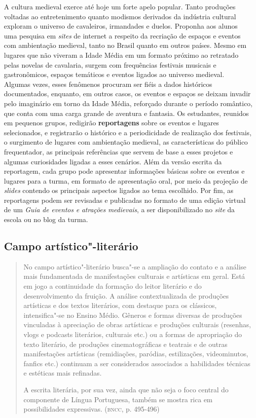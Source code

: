 \documentclass[11pt]{extarticle}
\begin{document}
  A cultura medieval exerce até hoje um forte apelo popular. Tanto
  produções voltadas ao entretenimento quanto modismos derivados da
  indústria cultural exploram o universo de cavaleiros, irmandades e
  duelos. Proponha aos alunos uma pesquisa em \emph{sites} de internet a
  respeito da recriação de espaços e eventos com ambientação medieval,
  tanto no Brasil quanto em outros países. Mesmo em lugares que não
  viveram a Idade Média em um formato próximo ao retratado pelas novelas
  de cavalaria, surgem com frequências festivais musicais e
  gastronômicos, espaços temáticos e eventos ligados ao universo
  medieval. Algumas vezes, esses fenômenos procuram ser fiéis a dados
  históricos documentados, enquanto, em outros casos, os eventos e
  espaços se deixam invadir pelo imaginário em torno da Idade Média,
  reforçado durante o período romântico, que conta com uma carga grande
  de aventura e fantasia. Os estudantes, reunidos em pequenos grupos,
  redigirão \textbf{reportagens} sobre os eventos e lugares
  selecionados, e registrarão o histórico e a periodicidade de
  realização dos festivais, o surgimento de lugares com ambientação
  medieval, as características do público frequentador, as principais
  referências que servem de base a esses projetos e algumas curiosidades
  ligadas a esses cenários. Além da versão escrita da reportagem, cada
  grupo pode apresentar informações básicas sobre os eventos e lugares
  para a turma, em formato de apresentação oral, por meio da projeção de
  \emph{slides} contendo os principais aspectos ligados ao tema
  escolhido. Por fim, as reportagens podem ser revisadas e publicadas no
  formato de uma edição virtual de um \emph{Guia de eventos e atrações
  medievais}, a ser disponibilizado no \emph{site} da escola ou no blog
  da turma.

\subsection{Campo artístico"-literário }

\begin{quote}
No campo artístico"-literário busca"-se a ampliação do contato e a
análise mais fundamentada de manifestações culturais e artísticas em
geral. Está em jogo a continuidade da formação do leitor literário e do
desenvolvimento da fruição. A análise contextualizada de produções
artísticas e dos textos literários, com destaque para os clássicos,
intensifica"-se no Ensino Médio. Gêneros e formas diversas de produções
vinculadas à apreciação de obras artísticas e produções culturais
(resenhas, vlogs e podcasts literários, culturais etc.) ou a formas de
apropriação do texto literário, de produções cinematográficas e teatrais
e de outras manifestações artísticas (remidiações, paródias,
estilizações, videominutos, fanfics etc.) continuam a ser considerados
associados a habilidades técnicas e estéticas mais refinadas.

A escrita literária, por sua vez, ainda que não seja o foco central do
componente de Língua Portuguesa, também se mostra rica em possibilidades
expressivas. (\textsc{bncc}, p. 495-496)
\end{quote}
\end{document}
